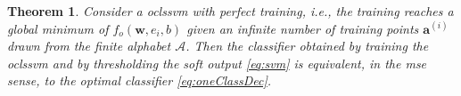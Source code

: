 \documentclass[draftcls,onecolumn,12pt]{IEEEtran}
\newcommand{\ie}{i.e., }
\newtheorem{theorem}{Theorem}
\begin{document}

\begin{theorem}
	\label{th:onelsnp}
	Consider a \ac{oclssvm} with perfect training, \ie the training reaches a global minimum of $f_o(\mathbf{w},e_i,b)$ given an infinite number of training points $\bm{a}^{(i)}$ drawn from the finite alphabet $\mathcal A$. Then the classifier obtained by training the \ac{oclssvm} and by thresholding the soft output \eqref{eq:svm} is equivalent, in the \ac{mse} sense, to the optimal classifier \eqref{eq:oneClassDec}.
\end{theorem}
\end{document}
